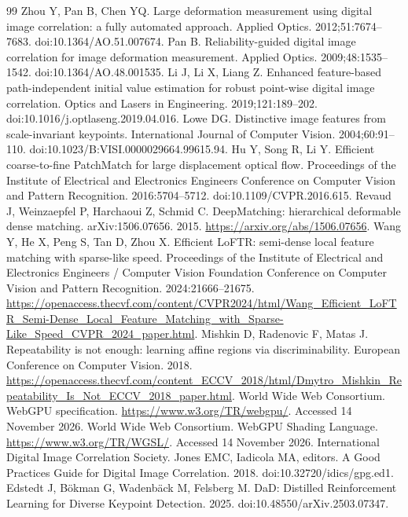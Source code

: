 \begin{thebibliography}{99}
 Zhou Y, Pan B, Chen YQ. Large deformation measurement using digital image correlation: a fully automated approach. Applied Optics. 2012;51:7674--7683. doi:10.1364/AO.51.007674.
 Pan B. Reliability-guided digital image correlation for image deformation measurement. Applied Optics. 2009;48:1535--1542. doi:10.1364/AO.48.001535.
 Li J, Li X, Liang Z. Enhanced feature-based path-independent initial value estimation for robust point-wise digital image correlation. Optics and Lasers in Engineering. 2019;121:189--202. doi:10.1016/j.optlaseng.2019.04.016.
 Lowe DG. Distinctive image features from scale-invariant keypoints. International Journal of Computer Vision. 2004;60:91--110. doi:10.1023/B:VISI.0000029664.99615.94.
 Hu Y, Song R, Li Y. Efficient coarse-to-fine PatchMatch for large displacement optical flow. Proceedings of the Institute of Electrical and Electronics Engineers Conference on Computer Vision and Pattern Recognition. 2016:5704--5712. doi:10.1109/CVPR.2016.615.
 Revaud J, Weinzaepfel P, Harchaoui Z, Schmid C. DeepMatching: hierarchical deformable dense matching. arXiv:1506.07656. 2015. \url{https://arxiv.org/abs/1506.07656}.
 Wang Y, He X, Peng S, Tan D, Zhou X. Efficient LoFTR: semi-dense local feature matching with sparse-like speed. Proceedings of the Institute of Electrical and Electronics Engineers / Computer Vision Foundation Conference on Computer Vision and Pattern Recognition. 2024:21666--21675. \url{https://openaccess.thecvf.com/content/CVPR2024/html/Wang_Efficient_LoFTR_Semi-Dense_Local_Feature_Matching_with_Sparse-Like_Speed_CVPR_2024_paper.html}.
 Mishkin D, Radenovic F, Matas J. Repeatability is not enough: learning affine regions via discriminability. European Conference on Computer Vision. 2018. \url{https://openaccess.thecvf.com/content_ECCV_2018/html/Dmytro_Mishkin_Repeatability_Is_Not_ECCV_2018_paper.html}.
 World Wide Web Consortium. WebGPU specification. \url{https://www.w3.org/TR/webgpu/}. Accessed 14 November 2026.
 World Wide Web Consortium. WebGPU Shading Language. \url{https://www.w3.org/TR/WGSL/}. Accessed 14 November 2026.
 International Digital Image Correlation Society. Jones EMC, Iadicola MA, editors. A Good Practices Guide for Digital Image Correlation. 2018. doi:10.32720/idics/gpg.ed1.
 Edstedt J, B\"okman G, Wadenb\"ack M, Felsberg M. DaD: Distilled Reinforcement Learning for Diverse Keypoint Detection. 2025. doi:10.48550/arXiv.2503.07347.

\end{thebibliography}

